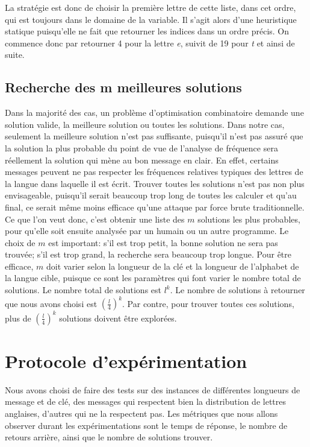 \documentclass[11pt]{article}
\begin{document}
				La stratégie est donc de choisir la première lettre de cette liste, dans cet ordre, qui est toujours dans le domaine de la variable.
				Il s'agit alors d'une heuristique statique puisqu'elle ne fait que retourner les indices dans un ordre précis.
				On commence donc par retourner 4 pour la lettre \emph{e}, suivit de 19 pour \emph{t} et ainsi de suite.

		\subsection{Recherche des m meilleures solutions}
			Dans la majorité des cas, un problème d'optimisation combinatoire demande une solution valide, la meilleure solution ou toutes les solutions.
			Dans notre cas, seulement la meilleure solution n'est pas suffisante, puisqu'il n'est pas assuré que la solution la plus probable du point de vue de l'analyse de fréquence sera réellement la solution qui mène au bon message en clair.
			En effet, certains messages peuvent ne pas respecter les fréquences relatives typiques des lettres de la langue dans laquelle il est écrit.
			Trouver toutes les solutions n'est pas non plus envisageable, puisqu'il serait beaucoup trop long de toutes les calculer et qu'au final, ce serait même moins efficace qu'une attaque par force brute traditionnelle.\\

			Ce que l'on veut donc, c'est obtenir une liste des $m$ solutions les plus probables, pour qu'elle soit ensuite analysée par un humain ou un autre programme.
			Le choix de $m$ est important: s'il est trop petit, la bonne solution ne sera pas trouvée; s'il est trop grand, la recherche sera beaucoup trop longue.
			Pour être efficace, $m$ doit varier selon la longueur de la clé et la longueur de l'alphabet de la langue cible, puisque ce sont les paramètres qui font varier le nombre total de solutions.
			Le nombre total de solutions est $l^k$. Le nombre de solutions à retourner que nous avons choisi est $(\frac{l}{4})^k$.
			Par contre, pour trouver toutes ces solutions, plus de $(\frac{l}{4})^k$ solutions doivent être explorées.\\


    \section{Protocole d'expérimentation}
		Nous avons choisi de faire des tests  sur des instances de différentes
		longueurs de message et de clé, des messages qui respectent bien la
		distribution de lettres anglaises, d'autres qui ne la respectent pas. Les
		métriques que nous allons observer durant les expérimentations sont le
		temps de réponse, le nombre de retours arrière, ainsi que le nombre de
		solutions trouver. \\
\end{document}
